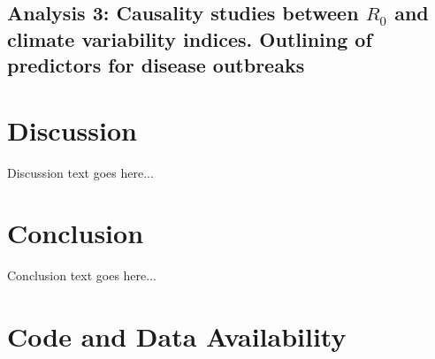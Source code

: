 \documentclass[
	a4paper, %
	8pt, %
	unnumberedsections, %
	twoside, %
]{LTJournalArticle}
\begin{document}
  \subsection{Analysis 3: Causality studies between $R_0$ and climate variability indices. Outlining of predictors for disease outbreaks} \label{sec-results-3}

  \section{Discussion}

  Discussion text goes here...

  \section{Conclusion}

  Conclusion text goes here...

  \section{Code and Data Availability}





\end{document}
